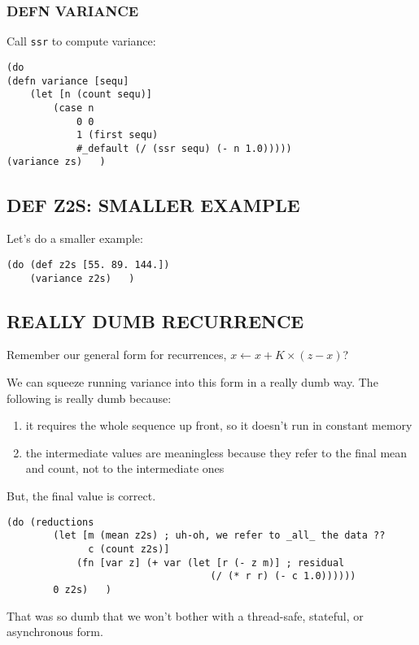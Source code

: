 \documentclass[10pt,oneside,x11names]{article}
\begin{document}
\subsubsection{DEFN VARIANCE}
\label{variance}
Call \texttt{ssr} to compute variance:

\begin{verbatim}
(do
(defn variance [sequ]
    (let [n (count sequ)]
        (case n
            0 0
            1 (first sequ)
            #_default (/ (ssr sequ) (- n 1.0)))))
(variance zs)   )
\end{verbatim}

\subsection{DEF Z2S: SMALLER EXAMPLE}
\label{smaller-example}
Let's do a smaller example:

\begin{verbatim}
(do (def z2s [55. 89. 144.])
    (variance z2s)   )
\end{verbatim}

\subsection{REALLY DUMB RECURRENCE}
\label{really-dumb-recurrence}
Remember our general form for recurrences,
\(x\leftarrow{}x + K\times{}(z-x)\)?

We can squeeze running variance into this form in a really dumb way. The
following is really dumb because:

\begin{enumerate}
\item it requires the whole sequence up front, so it doesn't run in constant memory

\item the intermediate values are meaningless because they refer to the final mean
and count, not to the intermediate ones
\end{enumerate}

But, the final value is correct.

\begin{verbatim}
(do (reductions
        (let [m (mean z2s) ; uh-oh, we refer to _all_ the data ??
              c (count z2s)]
            (fn [var z] (+ var (let [r (- z m)] ; residual
                                   (/ (* r r) (- c 1.0))))))
        0 z2s)   )
\end{verbatim}

That was so dumb that we won't bother with a thread-safe,
stateful, or asynchronous form.
\end{document}
